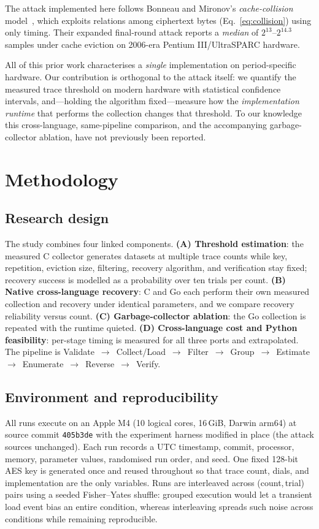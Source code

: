 \documentclass[11pt]{article}
\begin{document}
The attack implemented here follows Bonneau and Mironov's
\emph{cache-collision} model~\cite{bonneau06}, which exploits relations among
ciphertext bytes (Eq.~\eqref{eq:collision}) using only timing. Their expanded
final-round attack reports a \emph{median} of $2^{13}$--$2^{14.3}$ samples under
cache eviction on 2006-era Pentium III/UltraSPARC hardware.

All of this prior work characterises a \emph{single} implementation on
period-specific hardware. Our contribution is orthogonal to the attack itself:
we quantify the measured trace threshold on modern hardware with statistical
confidence intervals, and---holding the algorithm fixed---measure how the
\emph{implementation runtime} that performs the collection changes that
threshold. To our knowledge this cross-language, same-pipeline comparison, and
the accompanying garbage-collector ablation, have not previously been reported.

\section{Methodology}
\label{sec:method}

\subsection{Research design}
The study combines four linked components. \textbf{(A) Threshold estimation}: the
measured C collector generates datasets at multiple trace counts while key,
repetition, eviction size, filtering, recovery algorithm, and verification stay
fixed; recovery success is modelled as a probability over ten trials per count.
\textbf{(B) Native cross-language recovery}: C and Go each perform their own
measured collection and recovery under identical parameters, and we compare
recovery reliability versus count. \textbf{(C) Garbage-collector ablation}: the
Go collection is repeated with the runtime quieted. \textbf{(D) Cross-language
cost and Python feasibility}: per-stage timing is measured for all three ports
and extrapolated. The pipeline is
Validate~$\rightarrow$~Collect/Load~$\rightarrow$~Filter~$\rightarrow$~Group~$\rightarrow$~Estimate~$\rightarrow$~Enumerate~$\rightarrow$~Reverse~$\rightarrow$~Verify.

\subsection{Environment and reproducibility}
All runs execute on an Apple M4 (10 logical cores, 16\,GiB, Darwin arm64) at
source commit \texttt{405b3de} with the experiment harness modified in place
(the attack sources unchanged). Each run records a UTC timestamp, commit,
processor, memory, parameter values, randomised run order, and seed. One fixed
128-bit AES key is generated once and reused throughout so that trace count,
dials, and implementation are the only variables. Runs are interleaved across
(count,\,trial) pairs using a seeded Fisher--Yates shuffle: grouped execution
would let a transient load event bias an entire condition, whereas interleaving
spreads such noise across conditions while remaining reproducible.
\end{document}
